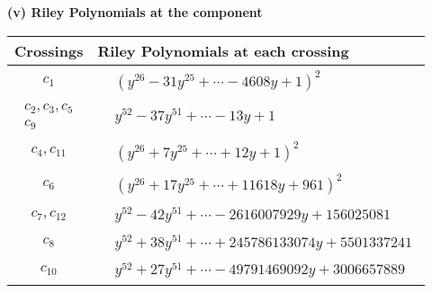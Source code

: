 \documentclass[1p]{elsarticle_modified}
\theoremstyle{definition}
\begin{document}
\newpage\renewcommand{\arraystretch}{1}
\flushleft \textbf{(v) Riley Polynomials at the component}\newline \\
\begin{tabular}{m{50pt}|m{274pt}}
Crossings & \hspace{64pt}Riley Polynomials at each crossing \\
\hline $$\begin{aligned}c_{1}\end{aligned}$$&$\begin{aligned}
&(y^{26}-31 y^{25}+\cdots-4608 y+1)^{2}
\end{aligned}$\\
\hline $$\begin{aligned}c_{2},c_{3},c_{5}\\c_{9}\end{aligned}$$&$\begin{aligned}
&y^{52}-37 y^{51}+\cdots-13 y+1
\end{aligned}$\\
\hline $$\begin{aligned}c_{4},c_{11}\end{aligned}$$&$\begin{aligned}
&(y^{26}+7 y^{25}+\cdots+12 y+1)^{2}
\end{aligned}$\\
\hline $$\begin{aligned}c_{6}\end{aligned}$$&$\begin{aligned}
&(y^{26}+17 y^{25}+\cdots+11618 y+961)^{2}
\end{aligned}$\\
\hline $$\begin{aligned}c_{7},c_{12}\end{aligned}$$&$\begin{aligned}
&y^{52}-42 y^{51}+\cdots-2616007929 y+156025081
\end{aligned}$\\
\hline $$\begin{aligned}c_{8}\end{aligned}$$&$\begin{aligned}
&y^{52}+38 y^{51}+\cdots+245786133074 y+5501337241
\end{aligned}$\\
\hline $$\begin{aligned}c_{10}\end{aligned}$$&$\begin{aligned}
&y^{52}+27 y^{51}+\cdots-49791469092 y+3006657889
\end{aligned}$\\
\hline
\end{tabular}\\~\\
\end{document}

